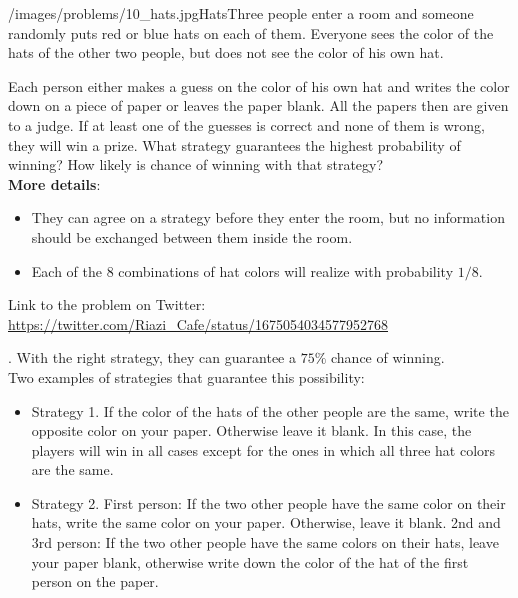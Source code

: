 \begin{problem}{/images/problems/10_hats.jpg}{Hats}Three people enter a room and someone randomly puts red or blue hats on each of them. Everyone sees the color of the hats of the other two people, but does not see the color of his own hat.

Each person either makes a guess on the color of his own hat and writes the color down on a piece of paper or leaves the paper blank. All the papers then are given to a judge. If at least one of the guesses is correct and none of them is wrong, they will win a  prize. What strategy guarantees the highest probability of winning? How likely is chance of winning with that strategy?\\[0.2cm]

\textbf{More details}:
\begin{itemize}
\item They can agree on a strategy before they enter the room, but no information should be exchanged between them inside the room.
\item Each of the 8 combinations of hat colors will realize with probability $1/8$.
\end{itemize}

Link to the problem on Twitter:  \url{https://twitter.com/Riazi_Cafe/status/1675054034577952768}\end{problem}
\begin{solution}.
With the right strategy, they can guarantee a $75\%$ chance of winning.\\[0.2cm]

Two examples of strategies that guarantee this possibility:

\begin{itemize}
	\item Strategy 1. If the color of the hats of the other people are the same, write the opposite color on your paper. Otherwise leave it blank. In this case, the players will win in all cases except for the ones in which all three hat colors are the same.

\item Strategy 2. First person: If the two other people have the same color on their hats, write the same color on your paper. Otherwise, leave it blank.
2nd and 3rd person: If the two other people have the same colors on their hats, leave your paper blank, otherwise write down the color of the hat of the first person on the paper.
\end{itemize}

\end{solution}
